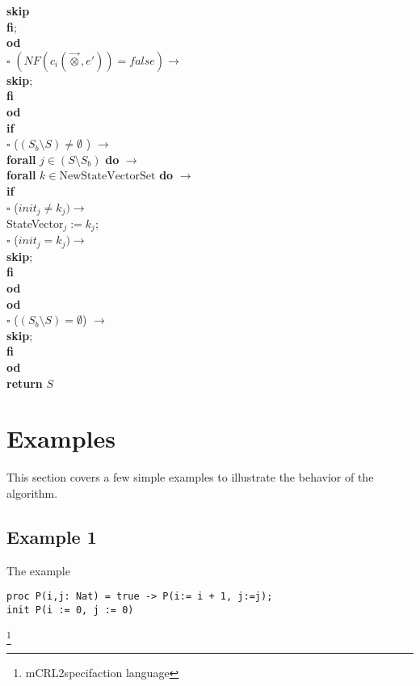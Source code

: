 \documentclass[a4paper,10pt]{article}
\theoremstyle{plain}
\theoremstyle{definition}
\newcommand{\ovr}{\overrightarrow}
\newcommand{\mcrl}{mCRL2}
\newcommand{\tb}{\textbf}
\newcommand{\ra}{$\rightarrow$}
\newcommand{\sq}{$\square$}
\begin{document}
\begin{tabbing}
  \>	\>	\> 	\>    	\>        \> \>  \tb{skip}\\
  \>	\>	\> 	\> 	\>          \tb{fi}; \\
  \>	\>	\>	\> \tb{od}\\
  \>	\>	\sq 	\>  $(NF(c_i(\ovr{\otimes},e')) = false) \rightarrow$ \\
  \>	\>	\> 	\>\tb{skip};\\
  \>	\>	\tb{fi}\\
  \>	\tb{od} \\
  \>	\tb{if}  \\
  \>	\sq	\> ($( S_{b} \setminus S) \neq \emptyset $ ) \ra \\ 
  \>	\>	\> 	\tb{forall}  $j \in ( S \setminus S_b) $ \tb{do} $\rightarrow$\\
  \>	\>	\>  	\> 	\tb{forall} $k \in \text{NewStateVectorSet}$ \tb{do} $\rightarrow$ \\
  \>	\>	\> 	\> 	\>   	\tb{if} \\
  \>	\>	\>  	\> 	\> 	\sq 	\>	($init_j \not= k_j) \rightarrow$ \\
  \>	\>	\>	\>	\>	\>	\>	\>	StateVector$_j := k_j$; \\
  \> 	\>	\>	\>	\>	\sq	\>	($init_j = k_j) \rightarrow$ \\
  \>	\>	\>	\>	\>	\>	\>	\>	\tb{skip};\\
  \>	\>	\>	\>	\>	\tb{fi}\\
  \> 	\>	\>	\>	\tb{od}\\
  \>	\>	\>	\tb{od}\\
  \>	\sq	\>  	($ (S_b \setminus S) = \emptyset $) \ra  \\
  \>	\> 	\>  	\>	\tb{skip};\\
  \>	\tb{fi} \\
  \tb{od}\\
  \tb{return} $S$
\end{tabbing} 

\section{Examples}
This section covers a few simple examples to illustrate the behavior of the algorithm. 
\subsection{Example 1} The example \\
\begin{verbatim}
proc P(i,j: Nat) = true -> P(i:= i + 1, j:=j);
init P(i := 0, j := 0)
\end{verbatim} \footnote{\mcrl specifaction language}
\end{document}

